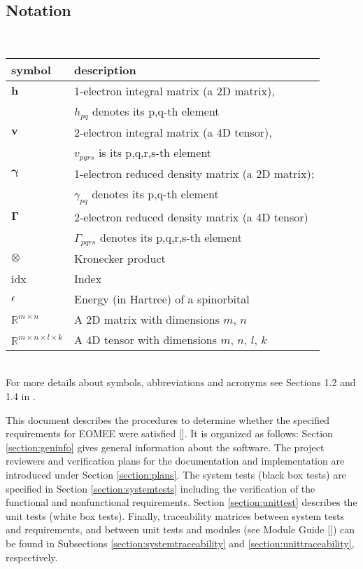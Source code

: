 \documentclass[12pt, titlepage]{article}
\begin{document}
\subsection{Notation}
\\
\renewcommand{\arraystretch}{1.2}
\begin{tabular}{l l} 
	\toprule		
	\textbf{symbol} & \textbf{description}\\
	\midrule
	$\mathbf{h}$ & 1-electron integral matrix (a 2D matrix),\\
	& $h_{pq}$ denotes its p,q-th element\\
	$\mathbf{v}$ & 2-electron integral matrix (a 4D tensor),\\
	& $v_{pqrs}$ is its p,q,r,s-th element\\
	$\boldsymbol{\gamma}$ & 1-electron reduced density matrix (a 2D matrix);\\
	&$\gamma_{pq}$ denotes its p,q-th element\\
	$\boldsymbol{\Gamma}$ & 2-electron reduced density matrix (a 4D tensor)\\
	&$\Gamma_{pqrs}$ denotes its p,q,r,s-th element\\
	$\otimes$ & Kronecker product\\
	idx & Index\\
	$\epsilon$& Energy (in Hartree) of a spinorbital\\
	$\mathbb{R}^{m \times n}$& A 2D matrix with dimensions $m$, $n$\\
	$\mathbb{R}^{m \times n \times l \times k}$& A 4D tensor with dimensions 
	$m$, 
	$n$, $l$, $k$\\
	\bottomrule
\end{tabular}\\
\newline For more details about symbols, abbreviations and acronyms see 
Sections 1.2 and 
1.4 in \cite{SRS2020}.

\newpage


This document describes the procedures to determine whether the specified 
requirements for EOMEE were satisfied [\cite{SRS2020}]. It is organized as 
follows: Section \ref{section:geninfo} gives general information about the 
software. The project reviewers and verification plans for the documentation 
and implementation are introduced under Section \ref{section:plans}. The system 
tests (black box tests) are specified in Section \ref{section:systemtests} 
including the verification of the functional and nonfunctional requirements. 
Section \ref{section:unittest} describes the unit tests (white box tests). 
Finally, traceability matrices between system tests and requirements, and 
between unit tests and modules (see Module Guide [\cite{MG2020}]) can be found 
in Subsections \ref{section:systemtraceability} and 
\ref{section:unittraceability}, respectively.
\end{document}
